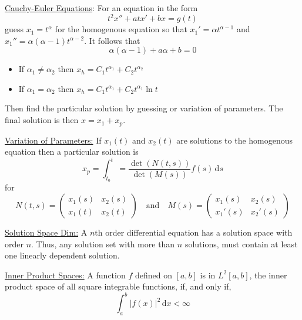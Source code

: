 \documentclass{exam}
\begin{document}
    \newpage 

    \underline{Cauchy-Euler Equations}: For an equation in the form 
    \[
        t^2 x'' + at x' + bx = g(t) 
    \]
    guess $x_1 = t^{\alpha}$ for the homogenous equation so that $x_1' = \alpha t^{\alpha -1}$ and $x_1'' = \alpha(\alpha - 1)t^{\alpha - 2}$. It follows that 
    \[
        \alpha(\alpha-1) + a\alpha + b = 0    
    \]

    \begin{minipage}{0.45\linewidth}
        \begin{itemize}
            \item If $\alpha_1 \neq \alpha_2$ then $x_h = C_1 t^{\alpha_{1}} + C_2 t^{\alpha_{2}}$
        \end{itemize}    
    \end{minipage}
    \hfill
    \begin{minipage}{0.45\linewidth}
        \begin{itemize}
            \item If $\alpha_1 = \alpha_2$ then $x_h = C_1 t^{\alpha_{1}} + C_2 t^{\alpha_{1}} \ln t$
        \end{itemize}    
    \end{minipage}

    Then find the particular solution by guessing or variation of parameters. The final solution is then $x = x_1 + x_p$.

    \underline{Variation of Parameters:} If $x_1(t)$ and $x_2(t)$ are solutions to the homogenous equation then a particular solution is 
    \[
        x_p = \int_{t_{0}}^{t} = \frac{\det(N(t, s))}{\det(M(s))}f(s)\,\mathrm{d}s
    \]
    for 
    \[
        N(t, s) = \begin{pmatrix}
            x_1(s) & x_2(s) \\
            x_1(t) & x_2(t)
        \end{pmatrix}    
        \quad\text{and}\quad
        M(s) = \begin{pmatrix}
            x_1(s) & x_2(s) \\
            x_1'(s) & x_2'(s) 
        \end{pmatrix}
    \]

    \underline{Solution Space Dim:} A $n$th order differential equation has a solution space with order $n$. Thus, any solution set with more than $n$ solutions, must contain at least one linearly dependent solution.


    \underline{Inner Product Spaces:} A function $f$ defined on $[a, b]$ is in $L^{2}[a, b]$, the inner product space of all square integrable functions, if, and only if, 
    \[
        \int_{a}^{b} |f(x)|^2\,\mathrm{d}x < \infty 
    \]
\end{document}
